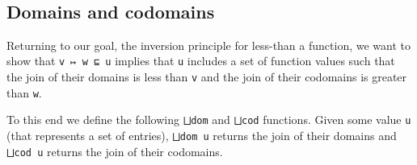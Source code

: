 \begin{fence}
\begin{code}
\AgdaSpace{}%
\AgdaSpace{}%
\AgdaSymbol{(}\AgdaSpace{}%
\AgdaSymbol{)}\<%
\\
\>[0]\AgdaSpace{}%
\AgdaSymbol{|}\AgdaSpace{}%
\AgdaSpace{}%
\AgdaSpace{}%
\AgdaOperator{\AgdaInductiveConstructor{,}}\AgdaSpace{}%
\AgdaSpace{}%
\AgdaSpace{}%
\AgdaOperator{\AgdaInductiveConstructor{,}}\AgdaSpace{}%
\AgdaSpace{}%
\AgdaSpace{}%
\AgdaSpace{}%
\AgdaSymbol{=}\AgdaSpace{}%
\AgdaSpace{}%
\AgdaSpace{}%
\AgdaOperator{\AgdaInductiveConstructor{,}}\AgdaSpace{}%
\AgdaSpace{}%
\AgdaSpace{}%
\AgdaOperator{\AgdaInductiveConstructor{,}}\AgdaSpace{}%
\AgdaSymbol{(}\AgdaSpace{}%
\AgdaSymbol{)}\AgdaSpace{}%
\AgdaSpace{}%
\<%
\end{code}
\end{fence}

\hypertarget{domains-and-codomains}{%
\subsection{Domains and codomains}\label{domains-and-codomains}}

Returning to our goal, the inversion principle for less-than a function,
we want to show that \texttt{v\ ↦\ w\ ⊑\ u} implies that \texttt{u}
includes a set of function values such that the join of their domains is
less than \texttt{v} and the join of their codomains is greater than
\texttt{w}.

To this end we define the following \texttt{⨆dom} and \texttt{⨆cod}
functions. Given some value \texttt{u} (that represents a set of
entries), \texttt{⨆dom\ u} returns the join of their domains and
\texttt{⨆cod\ u} returns the join of their codomains.

